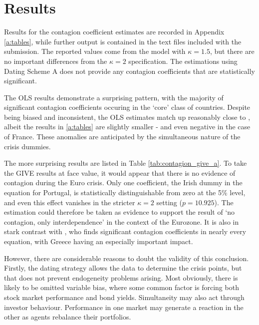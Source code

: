 \documentclass[/../base.tex]{subfiles}
\begin{document}
\section{Results}
\label{results}

Results for the contagion coefficient estimates are recorded in Appendix \ref{a:tables}, while further output is contained in the text files included with the submission. The reported values come from the model with $\kappa = 1.5$, but there are no important differences from the $\kappa = 2$ specification. The estimations using Dating Scheme A does not provide any contagion coefficients that are statistically significant.

The OLS results demonstrate a surprising pattern, with the majority of significant contagion coefficients occuring in the `core' class of countries. Despite being biased and inconsistent, the OLS estimates match up reasonably close to \cite{metiu2012sovereign}, albeit the results in \ref{a:tables} are slightly smaller - and even negative in the case of France. These anomalies are anticipated by the simultaneous nature of the crisis dummies.

The more surprising results are listed in Table \ref{tab:contagion_give_a}. To take the GIVE results at face value, it would appear that there is no evidence of contagion during the Euro crisis. Only one coefficient, the Irish dummy in the equation for Portugal, is statistically distinguishable from zero at the 5\% level, and even this effect vanishes in the stricter $\kappa = 2$ setting ($p = 10.925$). The estimation could therefore be taken as evidence to support the \cite{forbes2002no} result of `no contagion, only interdependence' in the context of the Eurozone. It is also in stark contrast with \cite{metiu2012sovereign}, who finds significant contagion coefficients in nearly every equation, with Greece having an especially important impact. 

However, there are considerable reasons to doubt the validity of this conclusion. Firstly, the dating strategy allows the data to determine the crisis points, but that does not prevent endogeneity problems arising. Most obviously, there is likely to be omitted variable bias, where some common factor is forcing both stock market performance and bond yields. Simultaneity may also act through investor behaviour. Performance in one market may generate a reaction in the other as agents rebalance their portfolios.   
\end{document}
